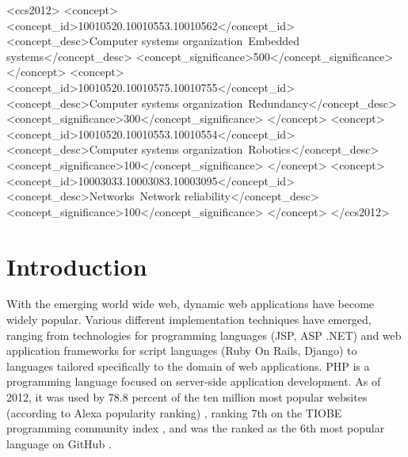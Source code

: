 \documentclass[sigconf]{acmart}
\begin{document}
%
%
\begin{CCSXML}
<ccs2012>
 <concept>
  <concept_id>10010520.10010553.10010562</concept_id>
  <concept_desc>Computer systems organization~Embedded systems</concept_desc>
  <concept_significance>500</concept_significance>
 </concept>
 <concept>
  <concept_id>10010520.10010575.10010755</concept_id>
  <concept_desc>Computer systems organization~Redundancy</concept_desc>
  <concept_significance>300</concept_significance>
 </concept>
 <concept>
  <concept_id>10010520.10010553.10010554</concept_id>
  <concept_desc>Computer systems organization~Robotics</concept_desc>
  <concept_significance>100</concept_significance>
 </concept>
 <concept>
  <concept_id>10003033.10003083.10003095</concept_id>
  <concept_desc>Networks~Network reliability</concept_desc>
  <concept_significance>100</concept_significance>
 </concept>
</ccs2012>  
\end{CCSXML}




\maketitle

\section{Introduction}
With the emerging world wide web, dynamic web applications have become
widely popular. Various different implementation techniques have emerged,
ranging from technologies for programming languages (JSP, ASP .NET) and web
application frameworks for  script languages (Ruby On Rails, Django) to
languages tailored specifically to the domain of web applications. PHP
\cite{phpNET} is a programming language focused on server-side application
development. As of 2012, it was used by 78.8 percent of the ten million most popular websites (according
to Alexa popularity ranking) \cite{alexaPHP}, ranking 7th on the TIOBE
programming community index \cite{tiobePHP}, and was the ranked as the 6th
most popular language on GitHub \cite{githubPHP}.
\end{document}
